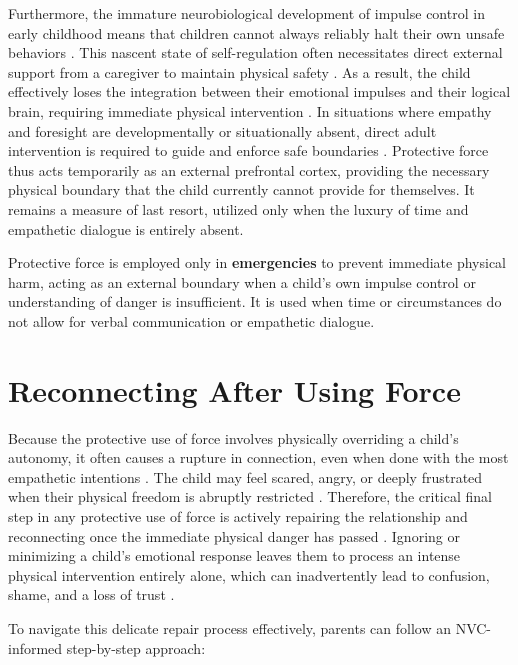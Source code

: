 Furthermore, the immature neurobiological development of impulse control in early childhood means that children cannot always reliably halt their own unsafe behaviors \citep{shonkoff2000}.
This nascent state of self-regulation often necessitates direct external support from a caregiver to maintain physical safety \citep{howard2024}.
As a result, the child effectively loses the integration between their emotional impulses and their logical brain, requiring immediate physical intervention \citep{siegel2011}.
In situations where empathy and foresight are developmentally or situationally absent, direct adult intervention is required to guide and enforce safe boundaries \citep{decety2021}.
Protective force thus acts temporarily as an external prefrontal cortex, providing the necessary physical boundary that the child currently cannot provide for themselves.
It remains a measure of last resort, utilized only when the luxury of time and empathetic dialogue is entirely absent.

\begin{keyinsight}
Protective force is employed only in \textbf{emergencies} to prevent immediate physical harm, acting as an external boundary when a child's own impulse control or understanding of danger is insufficient.
It is used when time or circumstances do not allow for verbal communication or empathetic dialogue.
\end{keyinsight}

\section{Reconnecting After Using Force}

Because the protective use of force involves physically overriding a child's autonomy, it often causes a rupture in connection, even when done with the most empathetic intentions \citep{schore2001}.
The child may feel scared, angry, or deeply frustrated when their physical freedom is abruptly restricted \citep{lobue2022}.
Therefore, the critical final step in any protective use of force is actively repairing the relationship and reconnecting once the immediate physical danger has passed \citep{siegel2003, gottman1997}.
Ignoring or minimizing a child's emotional response leaves them to process an intense physical intervention entirely alone, which can inadvertently lead to confusion, shame, and a loss of trust \citep{cassidy1994}.

To navigate this delicate repair process effectively, parents can follow an NVC-informed step-by-step approach:

